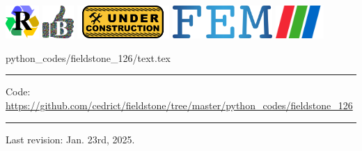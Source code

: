 \noindent
\includegraphics[height=1.25cm]{images/pictograms/replication}
\includegraphics[height=1.25cm]{images/pictograms/benchmark}
\includegraphics[height=1.25cm]{images/pictograms/under_construction}
\includegraphics[height=1.25cm]{images/pictograms/FEM}
\includegraphics[height=1.25cm]{images/pictograms/paraview}


\begin{flushright} {\tiny {\color{gray} python\_codes/fieldstone\_126/text.tex}} \end{flushright}

%

\par\noindent\rule{\textwidth}{0.4pt}

\begin{center}
\inpython
{\small Code: \url{https://github.com/cedrict/fieldstone/tree/master/python_codes/fieldstone_126}}
\end{center}



\par\noindent\rule{\textwidth}{0.4pt}

Last revision: Jan. 23rd, 2025.

